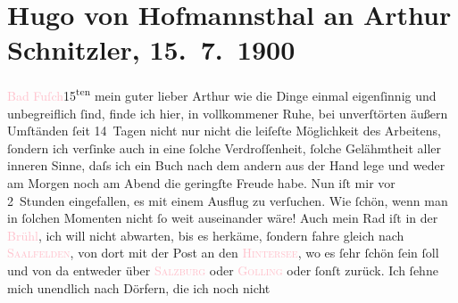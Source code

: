 

               \section[Hugo von Hofmannsthal an Arthur Schnitzler, 15. 7. 1900]{ Hugo von Hofmannsthal an Arthur Schnitzler, 15. 7. 1900}\nopagebreak{}\rehead{ }\normalsize\beginnumbering{} \toendnotes[C]{\smallbreak\pagebreak[2]} 
\toendnotes[C]{\smallbreak}\pstart
           \raggedleft{}{\pb}\textcolor{pink}{Bad Fuſch}{}\ledrightnote{\textcolor{pink}{Bad Fusch}}{ }15\textsuperscript{ten}\pend
           \pstart{}mein guter lieber Arthur\pend\pstart
           wie die Dinge einmal eigenſinnig und unbegreiflich ſind, finde ich hier, in
               vollkommener Ruhe, bei unverſtörten äußern Umſtänden ſeit 14 Tagen nicht nur nicht
               die leiſeſte Möglichkeit des Arbeitens, ſondern ich verſinke auch in eine ſolche
               Verdroſſenheit, ſolche Gelähmtheit aller inneren Sinne, {\pb}daſs ich ein Buch nach dem andern
               aus der Hand lege und weder am Morgen noch am Abend die geringſte Freude habe. Nun
               iſt mir vor 2 Stunden eingefallen, es mit einem Ausflug zu verſuchen. Wie ſchön, wenn
               man in ſolchen Momenten nicht ſo weit auseinander wäre! Auch mein Rad iſt in der {\pb}\textcolor{pink}{Brühl}{}\ledrightnote{\textcolor{pink}{Brühl}}, ich will nicht abwarten, bis es herkäme,
               ſondern fahre gleich nach \textcolor{pink}{\textsc{Saalfelden}}{}\ledrightnote{\textcolor{pink}{Saalfelden am Steinernen Meer}}, von dort mit der Post an den \textcolor{pink}{\textsc{Hintersee}}{}\ledrightnote{\textcolor{pink}{Hintersee}}, wo es ſehr ſchön ſein ſoll und von da entweder über \textcolor{pink}{\textsc{Salzburg}}{}\ledrightnote{\textcolor{pink}{Salzburg}} oder \textcolor{pink}{\textsc{Golling}}{}\ledrightnote{\textcolor{pink}{Golling}} oder ſonſt zurück. Ich ſehne mich unendlich nach Dörfern, die ich noch nicht
